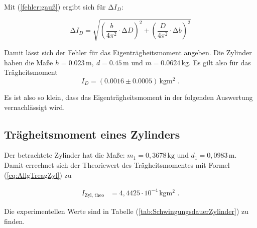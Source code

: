 Mit (\ref{fehler:gauß}) ergibt sich  für $\increment I_{D}$:

\begin{equation*}
  \increment I_{D} = \sqrt{\left(\frac{b}{4 \pi^2} \cdot  \increment D\right)^2 + \left(\frac{D}{4 \pi^2} \cdot  \increment b\right)^2}
\end{equation*}


Damit lässt sich der Fehler für das Eigenträgheitsmoment angeben.
Die Zylinder haben die Maße $h = 0.023 \, \unit{\meter}, \: d = 0.45 \, \unit{\meter} \text{ und } m = 0.0624 \, \unit{\kilo\gram}$.
Es gilt also für das Trägheitsmoment
\begin{equation*}
  I_{D} =  (0.0016 \pm 0.0005) \, \unit{\kilo\gram\meter\squared} \text{ .}
\end{equation*}

Es ist also so klein, dass das Eigenträgheitsmoment in der folgenden Auswertung vernachlässigt wird.


\subsection{Trägheitsmoment eines Zylinders}
\label{sec:TraegZylinder}

Der betrachtete Zylinder hat die Maße: $m_1 = 0,3678 \, \unit{\kilo\gram}$ und $d_1 = 0,0983 \, \unit{\meter}$.
Damit errechnet sich der Theoriewert des Trägheitsmomentes mit Formel (\ref{eq:AllgTreagZyl}) zu

\begin{align*}
  I_{\text{Zyl, theo}} &= 4,4425 \cdot 10^{-4} \, \unit{\kilo\gram\meter\squared} \text{ .}
\end{align*}

Die experimentellen Werte sind in Tabelle (\ref{tab:SchwingungsdauerZylinder}) zu finden.

